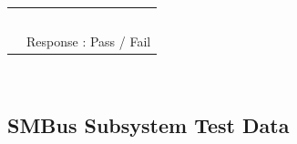 \documentclass[12pt]{article}
\begin{document}
\begin{appendices}
\begin{table}[h!]
\begin{tabular}{ | c | c | }
{%
\hfill \\[0.1 em]} &  \parbox{0.4\linewidth}{\raggedright \hfill \\ [0.7 em]
Response :  \underline{\hspace{0.625in}} 
\hspace{0.125 in}Pass \space / \space  Fail \hfill \\ [0.3 em]} \\ 
\hline
\end{tabular}
\end{table}
\hfill \\
\pagebreak

\subsection{SMBus Subsystem Test  Data}


\end{appendices}
\end{document}
